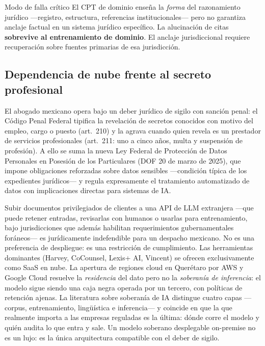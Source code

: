 \begin{alerta}{Modo de falla crítico}
El CPT de dominio enseña la \emph{forma} del razonamiento jurídico ---registro, estructura, referencias institucionales--- pero no garantiza anclaje factual en un sistema jurídico específico. La alucinación de citas \textbf{sobrevive al entrenamiento de dominio}. El anclaje jurisdiccional requiere recuperación sobre fuentes primarias de esa jurisdicción.
\end{alerta}

\subsection{Dependencia de nube frente al secreto profesional}

El abogado mexicano opera bajo un deber jurídico de sigilo con sanción penal: el Código Penal Federal tipifica la revelación de secretos conocidos con motivo del empleo, cargo o puesto (art.~210) y la agrava cuando quien revela es un prestador de servicios profesionales (art.~211: uno a cinco años, multa y suspensión de profesión).\cite{cpf} A ello se suma la nueva Ley Federal de Protección de Datos Personales en Posesión de los Particulares (DOF 20 de marzo de 2025), que impone obligaciones reforzadas sobre datos sensibles ---condición típica de los expedientes jurídicos--- y regula expresamente el tratamiento automatizado de datos con implicaciones directas para sistemas de IA.\cite{lfpdppp,cosio2026}

Subir documentos privilegiados de clientes a una API de LLM extranjera ---que puede retener entradas, revisarlas con humanos o usarlas para entrenamiento, bajo jurisdicciones que además habilitan requerimientos gubernamentales foráneos--- es jurídicamente indefendible para un despacho mexicano. No es una preferencia de despliegue: es una restricción de cumplimiento. Las herramientas dominantes (Harvey, CoCounsel, Lexis+ AI, Vincent) se ofrecen exclusivamente como SaaS en nube.\cite{harvey2026,vlex2018} La apertura de regiones cloud en Querétaro por AWS y Google Cloud\cite{aws2024,gcp2024} resuelve la \emph{residencia} del dato pero no la \emph{soberanía de inferencia}: el modelo sigue siendo una caja negra operada por un tercero, con políticas de retención ajenas. La literatura sobre soberanía de IA distingue cuatro capas ---corpus, entrenamiento, lingüística e inferencia--- y coincide en que la que realmente importa a las empresas reguladas es la última: dónde corre el modelo y quién audita lo que entra y sale.\cite{alia2026} Un modelo soberano desplegable on-premise no es un lujo: es la única arquitectura compatible con el deber de sigilo.

